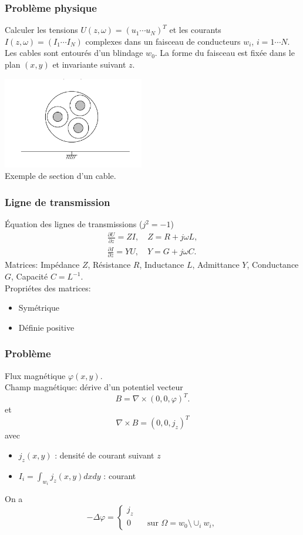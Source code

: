 \begin{frame}
  \frametitle{Probl\`eme physique}
  Calculer les tensions $U(z,\omega) =(u_1 \cdots u_N)^T$ et les courants
  $I(z,\omega) = (I_1\cdots I_N)$ complexes dans un faisceau de conducteurs
  $w_i$, $i=1\cdots N$. Les cables sont entour\'es d'un blindage $w_0$. La forme
  du faisceau est fix\'ee dans le plan $(x,y)$ et invariante suivant $z$.
  \begin{center}
    \includegraphics[height=4cm]{figures/f1}\\
    \small  Exemple de section d'un cable.
  \end{center}
\end{frame}


\begin{frame}
\frametitle{Ligne de transmission}
\'Equation des lignes de transmissions ($j^2=-1$)
\begin{eqnarray*}
\frac{\partial U}{\partial z} =ZI, \quad Z=R+j\omega L,\\
\frac{\partial I}{\partial z} =YU, \quad Y=G+j\omega C.
\end{eqnarray*}
Matrices: 
Imp\'edance $Z$, R\'esistance $R$, Inductance $L$, Admittance $Y$, Conductance $G$, Capacit\'e
$C=L^{-1}.$\\[0.4cm]
Propri\'etes des matrices: 
\begin{itemize}
\item Sym\'etrique
\item D\'efinie positive
\end{itemize}

\end{frame} 

\begin{frame}
\frametitle{Probl\`eme}
Flux magn\'etique $\varphi(x,y)$. \\
Champ magn\'etique: d\'erive d'un potentiel vecteur 
$$B=\nabla \times (0,0,\varphi)^T.$$ et
$$\nabla\times B=(0,0,j_z)^T$$ avec
\begin{itemize}
\item  $j_z(x,y)$ : densit\'e de courant suivant $z$
\item  $I_i= \int _{w_i}j_z(x,y)dxdy$ :  courant
\end{itemize}
On a
\begin{equation}
-\Delta\varphi =
\begin{cases}
j_z \\ 
0 \qquad \text{sur } \Omega =w_0 \setminus \cup_i w_i,
\end{cases}
\end{equation} 
\end{frame}

